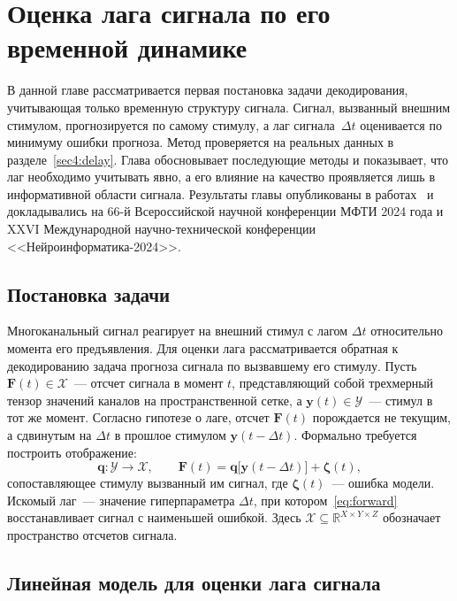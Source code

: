 \chapter{Оценка лага сигнала по его временной динамике}\label{ch:delay}

В данной главе рассматривается первая постановка задачи декодирования, учитывающая только временную структуру сигнала. Сигнал, вызванный внешним стимулом, прогнозируется по самому стимулу, а лаг сигнала~$\Delta t$ оценивается по минимуму ошибки прогноза. Метод проверяется на реальных данных в разделе~\ref{sec4:delay}. Глава обосновывает последующие методы и показывает, что лаг необходимо учитывать явно, а его влияние на качество проявляется лишь в информативной области сигнала. Результаты главы опубликованы в работах~\cite{dorin2024forecasting, dorin2024conf66mipt} и докладывались на 66-й Всероссийской научной конференции МФТИ 2024 года и XXVI Международной научно-технической конференции <<Нейроинформатика-2024>>.

\section{Постановка задачи}\label{sec2:delay}

Многоканальный сигнал реагирует на внешний стимул с лагом $\Delta t$ относительно момента его предъявления. Для оценки лага рассматривается обратная к декодированию задача прогноза сигнала по вызвавшему его стимулу. Пусть $\mathbf{F}(t) \in \mathcal{X}$~--- отсчет сигнала в момент $t$, представляющий собой трехмерный тензор значений каналов на пространственной сетке, а $\mathbf{y}(t) \in \mathcal{Y}$~--- стимул в тот же момент. Согласно гипотезе о лаге, отсчет $\mathbf{F}(t)$ порождается не текущим, а сдвинутым на $\Delta t$ в прошлое стимулом $\mathbf{y}(t - \Delta t)$. Формально требуется построить отображение:
\begin{equation}\label{eq:forward}
\mathbf{q}: \mathcal{Y} \to \mathcal{X}, \qquad \mathbf{F}(t) = \mathbf{q}\big[\mathbf{y}(t - \Delta t)\big] + \boldsymbol{\zeta}(t),
\end{equation}
сопоставляющее стимулу вызванный им сигнал, где $\boldsymbol{\zeta}(t)$~--- ошибка модели. Искомый лаг~--- значение гиперпараметра $\Delta t$, при котором~\eqref{eq:forward} восстанавливает сигнал с наименьшей ошибкой. Здесь $\mathcal{X} \subseteq \mathbb{R}^{X \times Y \times Z}$ обозначает пространство отсчетов сигнала.

\section{Линейная модель для оценки лага сигнала}\label{sec3:delay}

